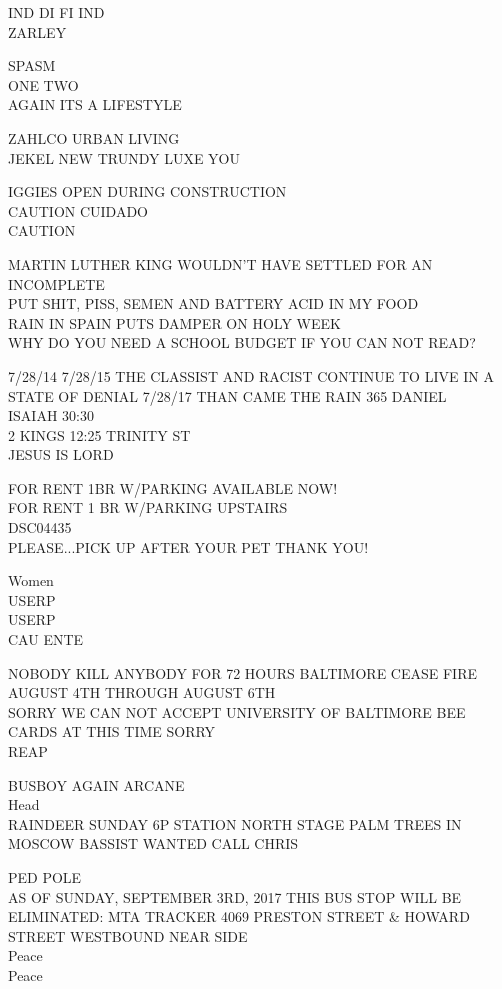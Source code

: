 \documentclass[10pt,letterpaper]{article}
\begin{document}
IND DI FI IND\\
ZARLEY

SPASM\\
ONE TWO\\
AGAIN ITS A LIFESTYLE

ZAHLCO URBAN LIVING\\
JEKEL NEW TRUNDY LUXE YOU

IGGIES OPEN DURING CONSTRUCTION\\
CAUTION CUIDADO\\
CAUTION

MARTIN LUTHER KING WOULDN'T HAVE SETTLED FOR AN INCOMPLETE\\
PUT SHIT, PISS, SEMEN AND BATTERY ACID IN MY FOOD\\
RAIN IN SPAIN PUTS DAMPER ON HOLY WEEK\\
WHY DO YOU NEED A SCHOOL BUDGET IF YOU CAN NOT READ?

7/28/14 7/28/15 THE CLASSIST AND RACIST CONTINUE TO LIVE IN A STATE OF DENIAL 7/28/17 THAN CAME THE RAIN 365 DANIEL\\
ISAIAH 30:30\\
2 KINGS 12:25 TRINITY ST\\
JESUS IS LORD

FOR RENT 1BR W/PARKING AVAILABLE NOW!\\
FOR RENT 1 BR W/PARKING UPSTAIRS\\
DSC04435\\
PLEASE...PICK UP AFTER YOUR PET THANK YOU!

Women\\
USERP\\
USERP\\
CAU ENTE

NOBODY KILL ANYBODY FOR 72 HOURS BALTIMORE CEASE FIRE AUGUST 4TH THROUGH AUGUST 6TH\\
SORRY WE CAN NOT ACCEPT UNIVERSITY OF BALTIMORE BEE CARDS AT THIS TIME SORRY\\
REAP

BUSBOY AGAIN ARCANE\\
Head\\
RAINDEER SUNDAY 6P STATION NORTH STAGE PALM TREES IN MOSCOW BASSIST WANTED CALL CHRIS

PED POLE\\
AS OF SUNDAY, SEPTEMBER 3RD, 2017 THIS BUS STOP WILL BE ELIMINATED: MTA TRACKER 4069 PRESTON STREET \& HOWARD STREET WESTBOUND NEAR SIDE\\
Peace\\
Peace
\end{document}
